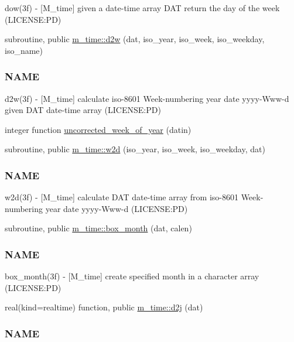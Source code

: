 \begin{DoxyCompactItemize}
\begin{DoxyCompactList}
dow(3f) -\/ \mbox{[}M\+\_\+time\mbox{]} given a date-\/time array D\+AT return the day of the week (L\+I\+C\+E\+N\+SE\+:PD) \end{DoxyCompactList}\item 
subroutine, public \mbox{\hyperlink{namespacem__time_ad4ff99ad6f6d5282c4b65ad636a2a627}{m\+\_\+time\+::d2w}} (dat, iso\+\_\+year, iso\+\_\+week, iso\+\_\+weekday, iso\+\_\+name)
\begin{DoxyCompactList}\small\item\em \subsubsection*{N\+A\+ME}

d2w(3f) -\/ \mbox{[}M\+\_\+time\mbox{]} calculate iso-\/8601 Week-\/numbering year date yyyy-\/\+Www-\/d given D\+AT date-\/time array (L\+I\+C\+E\+N\+SE\+:PD) \end{DoxyCompactList}\item 
integer function \mbox{\hyperlink{M__time_8f90_a4a68c5e906616f64da0c3d165fc41479}{uncorrected\+\_\+week\+\_\+of\+\_\+year}} (datin)
\item 
subroutine, public \mbox{\hyperlink{namespacem__time_ac0ec48db8d508bfa23fe4b20c9d1c5a3}{m\+\_\+time\+::w2d}} (iso\+\_\+year, iso\+\_\+week, iso\+\_\+weekday, dat)
\begin{DoxyCompactList}\small\item\em \subsubsection*{N\+A\+ME}

w2d(3f) -\/ \mbox{[}M\+\_\+time\mbox{]} calculate D\+AT date-\/time array from iso-\/8601 Week-\/numbering year date yyyy-\/\+Www-\/d (L\+I\+C\+E\+N\+SE\+:PD) \end{DoxyCompactList}\item 
subroutine, public \mbox{\hyperlink{namespacem__time_a0fe7540912df30d3578f3c469413aea8}{m\+\_\+time\+::box\+\_\+month}} (dat, calen)
\begin{DoxyCompactList}\small\item\em \subsubsection*{N\+A\+ME}

box\+\_\+month(3f) -\/ \mbox{[}M\+\_\+time\mbox{]} create specified month in a character array (L\+I\+C\+E\+N\+SE\+:PD) \end{DoxyCompactList}\item 
real(kind=realtime) function, public \mbox{\hyperlink{namespacem__time_a3fccc53c2650104eff084c7998d18f54}{m\+\_\+time\+::d2j}} (dat)
\begin{DoxyCompactList}\small\item\em \subsubsection*{N\+A\+ME}


\end{DoxyCompactList}
\end{DoxyCompactItemize}
